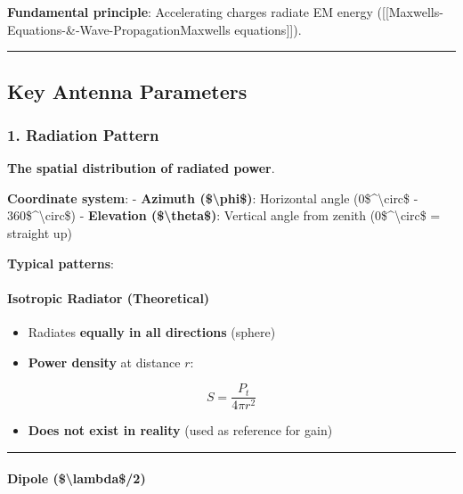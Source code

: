 \textbf{Fundamental principle}: Accelerating charges radiate EM energy
({[}{[}Maxwell\textquotesingle s-Equations-\&-Wave-Propagation\textbar Maxwell\textquotesingle s
equations{]}{]}).

\begin{center}\rule{0.5\linewidth}{0.5pt}\end{center}

\subsection{Key Antenna Parameters}\label{key-antenna-parameters}

\subsubsection{1. Radiation Pattern}\label{radiation-pattern}

\textbf{The spatial distribution of radiated power}.

\textbf{Coordinate system}: - \textbf{Azimuth (\$\textbackslash phi\$)}:
Horizontal angle (0\$\^{}\textbackslash circ\$ -
360\$\^{}\textbackslash circ\$) - \textbf{Elevation
(\$\textbackslash theta\$)}: Vertical angle from zenith
(0\$\^{}\textbackslash circ\$ = straight up)

\textbf{Typical patterns}:

\paragraph{Isotropic Radiator
(Theoretical)}\label{isotropic-radiator-theoretical}

\begin{itemize}
\tightlist
\item
  Radiates \textbf{equally in all directions} (sphere)
\item
  \textbf{Power density} at distance \(r\):
\end{itemize}

\[
S = \frac{P_t}{4\pi r^2}
\]

\begin{itemize}
\tightlist
\item
  \textbf{Does not exist in reality} (used as reference for gain)
\end{itemize}

\begin{center}\rule{0.5\linewidth}{0.5pt}\end{center}

\paragraph{Dipole (\$\textbackslash lambda\$/2)}\label{dipole-ux3bb2}

